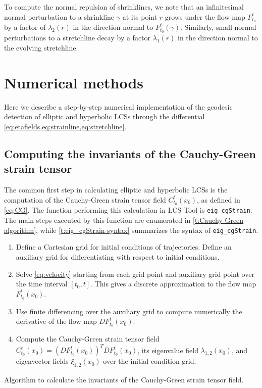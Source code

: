 \documentclass{elsarticle}
\begin{document}
To compute the normal repulsion of shrinklines, we note that an infinitesimal
normal perturbation to a shrinkline $\gamma$ at its point $r$ grows under the flow map $F_{t_{0}}^{t}$ by a factor of $\lambda_{2}(r)$ in the direction normal to $F_{t_{0}}^{t}(\gamma).$ Similarly, small normal perturbations to a stretchline decay by a factor $\lambda_{1}(r)$ in the direction normal to the evolving stretchline. 

\section{Numerical methods}

Here we describe a step-by-step numerical implementation of the geodesic detection of elliptic and hyperbolic LCSs through the differential \cref{eq:etafields,eq:strainline,eq:stretchline}.

\subsection{Computing the invariants of the Cauchy-Green strain tensor}

The common first step in calculating elliptic and hyperbolic LCSs is the computation of the Cauchy-Green strain tensor field $C_{t_0}^t(x_0)$, as defined in \cref{eq:CG}. The function performing this calculation in LCS Tool is \lstinline!eig_cgStrain!. The main steps executed by this function are enumerated in \cref{t:Cauchy-Green algorithm}, while \cref{t:eig_cgStrain syntax} summarizes the syntax of \lstinline!eig_cgStrain!.

\begin{table}
\begin{enumerate}
\item Define a Cartesian grid for initial conditions of trajectories. Define
an auxiliary grid for differentiating with respect to initial conditions.
\item Solve \cref{eq:velocity} starting from each grid point and auxiliary grid point over the time interval $[t_0,t]$. This gives a discrete approximation to the flow map $F_{t_0}^t(x_0)$.
\item Use finite differencing over the auxiliary grid to compute numerically the derivative of the flow map $DF_{t_0}^t(x_0)$.
\item Compute the Cauchy-Green strain tensor field $C_{t_0}^t(x_0) = \left(DF_{t_0}^t(x_0)\right)^T DF_{t_0}^t(x_0)$, its eigenvalue field $\lambda_{1,2}(x_0)$, and eigenvector fields $\xi_{1,2}(x_0)$ over the initial condition grid.
\end{enumerate}
\caption{Algorithm to calculate the invariants of the Cauchy-Green strain tensor field.}
\label{t:Cauchy-Green algorithm}
\end{table}
\end{document}
